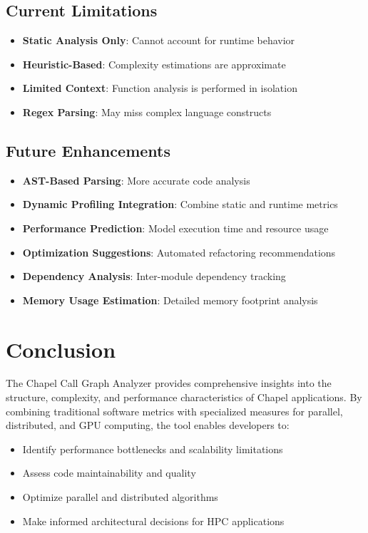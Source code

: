 \documentclass[11pt,a4paper]{article}
\begin{document}
\subsection{Current Limitations}

\begin{itemize}
    \item \textbf{Static Analysis Only}: Cannot account for runtime behavior
    \item \textbf{Heuristic-Based}: Complexity estimations are approximate
    \item \textbf{Limited Context}: Function analysis is performed in isolation
    \item \textbf{Regex Parsing}: May miss complex language constructs
\end{itemize}

\subsection{Future Enhancements}

\begin{itemize}
    \item \textbf{AST-Based Parsing}: More accurate code analysis
    \item \textbf{Dynamic Profiling Integration}: Combine static and runtime metrics
    \item \textbf{Performance Prediction}: Model execution time and resource usage
    \item \textbf{Optimization Suggestions}: Automated refactoring recommendations
    \item \textbf{Dependency Analysis}: Inter-module dependency tracking
    \item \textbf{Memory Usage Estimation}: Detailed memory footprint analysis
\end{itemize}

\section{Conclusion}

The Chapel Call Graph Analyzer provides comprehensive insights into the structure, complexity, and performance characteristics of Chapel applications. By combining traditional software metrics with specialized measures for parallel, distributed, and GPU computing, the tool enables developers to:

\begin{itemize}
    \item Identify performance bottlenecks and scalability limitations
    \item Assess code maintainability and quality
    \item Optimize parallel and distributed algorithms
    \item Make informed architectural decisions for HPC applications
\end{itemize}
\end{document}
